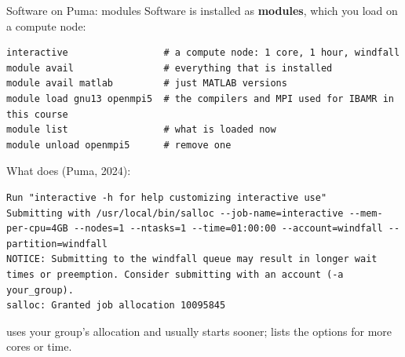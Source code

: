 \documentclass[aspectratio=169,11pt]{beamer}
\begin{document}
\begin{frame}[fragile]{Software on Puma: modules}
Software is installed as \textbf{modules}, which you load on a compute node:
\begin{lstlisting}[style=shell]
interactive                 # a compute node: 1 core, 1 hour, windfall
module avail                # everything that is installed
module avail matlab         # just MATLAB versions
module load gnu13 openmpi5  # the compilers and MPI used for IBAMR in this course
module list                 # what is loaded now
module unload openmpi5      # remove one
\end{lstlisting}
What  does (Puma, 2024):
\begin{lstlisting}[style=tiny]
Run "interactive -h for help customizing interactive use"
Submitting with /usr/local/bin/salloc --job-name=interactive --mem-per-cpu=4GB --nodes=1 --ntasks=1 --time=01:00:00 --account=windfall --partition=windfall
NOTICE: Submitting to the windfall queue may result in longer wait times or preemption. Consider submitting with an account (-a your_group).
salloc: Granted job allocation 10095845
\end{lstlisting}
\small {} uses your group's allocation and usually starts sooner;  lists the options for more cores or time.
\end{frame}
\end{document}

